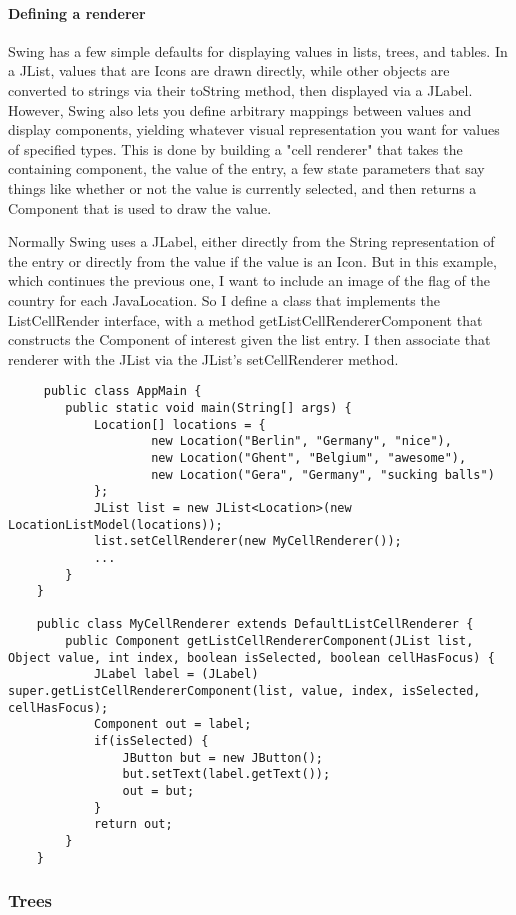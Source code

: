  \paragraph{Defining a renderer} Swing has a few simple defaults for displaying values in lists, trees, and tables. In a JList, values that are Icons are drawn directly, while other objects are converted to strings via their toString method, then displayed via a JLabel. However, Swing also lets you define arbitrary mappings between values and display components, yielding whatever visual representation you want for values of specified types. This is done by building a "cell renderer" that takes the containing component, the value of the entry, a few state parameters that say things like whether or not the value is currently selected, and then returns a Component that is used to draw the value. 
 
Normally Swing uses a JLabel, either directly from the String representation of the entry or directly from the value if the value is an Icon. But in this example, which continues the previous one, I want to include an image of the flag of the country for each JavaLocation. So I define a class that implements the ListCellRender interface, with a method getListCellRendererComponent that constructs the Component of interest given the list entry. I then associate that renderer with the JList via the JList's setCellRenderer method. 

\begin{lstlisting}
     public class AppMain {
    	public static void main(String[] args) {
    		Location[] locations = {
    				new Location("Berlin", "Germany", "nice"),
    				new Location("Ghent", "Belgium", "awesome"),
    				new Location("Gera", "Germany", "sucking balls")
    		};
    		JList list = new JList<Location>(new LocationListModel(locations));
    		list.setCellRenderer(new MyCellRenderer());
    		...
    	}
	}
	
	public class MyCellRenderer extends DefaultListCellRenderer {
    	public Component getListCellRendererComponent(JList list, Object value, int index, boolean isSelected, boolean cellHasFocus) {
    		JLabel label = (JLabel) super.getListCellRendererComponent(list, value, index, isSelected, cellHasFocus);
    		Component out = label;
    		if(isSelected) {
    			JButton but = new JButton();
    			but.setText(label.getText());
    			out = but;
    		}
    		return out;
    	}
    }
\end{lstlisting}
 
 
 \subsubsection{Trees}
 
